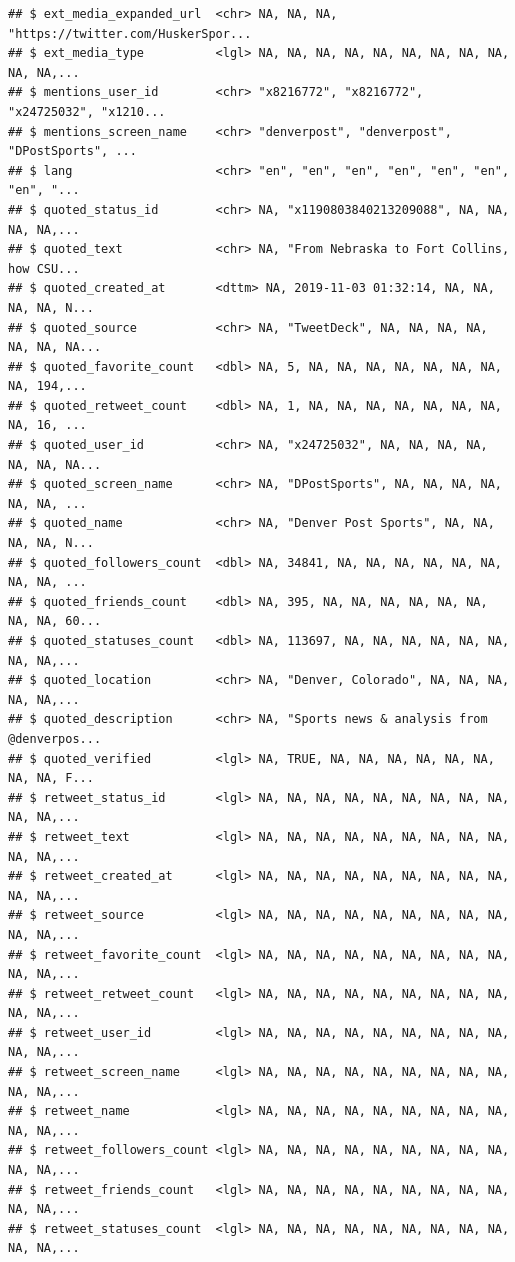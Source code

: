 \documentclass[
]{book}
\begin{document}
\begin{verbatim}
## $ ext_media_expanded_url  <chr> NA, NA, NA, "https://twitter.com/HuskerSpor...
## $ ext_media_type          <lgl> NA, NA, NA, NA, NA, NA, NA, NA, NA, NA, NA,...
## $ mentions_user_id        <chr> "x8216772", "x8216772", "x24725032", "x1210...
## $ mentions_screen_name    <chr> "denverpost", "denverpost", "DPostSports", ...
## $ lang                    <chr> "en", "en", "en", "en", "en", "en", "en", "...
## $ quoted_status_id        <chr> NA, "x1190803840213209088", NA, NA, NA, NA,...
## $ quoted_text             <chr> NA, "From Nebraska to Fort Collins, how CSU...
## $ quoted_created_at       <dttm> NA, 2019-11-03 01:32:14, NA, NA, NA, NA, N...
## $ quoted_source           <chr> NA, "TweetDeck", NA, NA, NA, NA, NA, NA, NA...
## $ quoted_favorite_count   <dbl> NA, 5, NA, NA, NA, NA, NA, NA, NA, NA, 194,...
## $ quoted_retweet_count    <dbl> NA, 1, NA, NA, NA, NA, NA, NA, NA, NA, 16, ...
## $ quoted_user_id          <chr> NA, "x24725032", NA, NA, NA, NA, NA, NA, NA...
## $ quoted_screen_name      <chr> NA, "DPostSports", NA, NA, NA, NA, NA, NA, ...
## $ quoted_name             <chr> NA, "Denver Post Sports", NA, NA, NA, NA, N...
## $ quoted_followers_count  <dbl> NA, 34841, NA, NA, NA, NA, NA, NA, NA, NA, ...
## $ quoted_friends_count    <dbl> NA, 395, NA, NA, NA, NA, NA, NA, NA, NA, 60...
## $ quoted_statuses_count   <dbl> NA, 113697, NA, NA, NA, NA, NA, NA, NA, NA,...
## $ quoted_location         <chr> NA, "Denver, Colorado", NA, NA, NA, NA, NA,...
## $ quoted_description      <chr> NA, "Sports news & analysis from @denverpos...
## $ quoted_verified         <lgl> NA, TRUE, NA, NA, NA, NA, NA, NA, NA, NA, F...
## $ retweet_status_id       <lgl> NA, NA, NA, NA, NA, NA, NA, NA, NA, NA, NA,...
## $ retweet_text            <lgl> NA, NA, NA, NA, NA, NA, NA, NA, NA, NA, NA,...
## $ retweet_created_at      <lgl> NA, NA, NA, NA, NA, NA, NA, NA, NA, NA, NA,...
## $ retweet_source          <lgl> NA, NA, NA, NA, NA, NA, NA, NA, NA, NA, NA,...
## $ retweet_favorite_count  <lgl> NA, NA, NA, NA, NA, NA, NA, NA, NA, NA, NA,...
## $ retweet_retweet_count   <lgl> NA, NA, NA, NA, NA, NA, NA, NA, NA, NA, NA,...
## $ retweet_user_id         <lgl> NA, NA, NA, NA, NA, NA, NA, NA, NA, NA, NA,...
## $ retweet_screen_name     <lgl> NA, NA, NA, NA, NA, NA, NA, NA, NA, NA, NA,...
## $ retweet_name            <lgl> NA, NA, NA, NA, NA, NA, NA, NA, NA, NA, NA,...
## $ retweet_followers_count <lgl> NA, NA, NA, NA, NA, NA, NA, NA, NA, NA, NA,...
## $ retweet_friends_count   <lgl> NA, NA, NA, NA, NA, NA, NA, NA, NA, NA, NA,...
## $ retweet_statuses_count  <lgl> NA, NA, NA, NA, NA, NA, NA, NA, NA, NA, NA,...

\end{verbatim}
\end{document}
